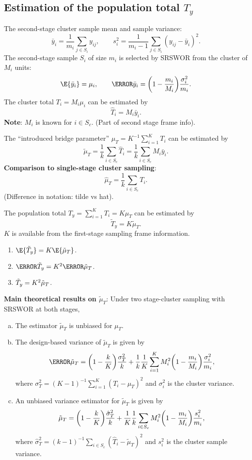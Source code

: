 \subsection{Estimation of the population total \texorpdfstring{$ T_y $}{Ty}}

The second-stage cluster sample mean and sample variance:
\[ \bar{y}_i=\frac{1}{m_i}\sum_{j\in S_i}y_{ij},\qquad s_i^2=\frac{1}{m_i-1}\sum_{j\in S_i}(y_{ij}-\bar{y}_i)^2. \]
The second-stage sample $ S_i $ of size $ m_i $ is selected by SRSWOR from the cluster of $ M_i $ units:
\[ \E{\bar{y}_i}=\mu_i,\qquad \V{\bar{y}_i}=\biggl(1-\frac{m_i}{M_i}\biggr)\frac{\sigma_i^2}{m_i}. \]
The cluster total $ T_i=M_i\mu_i $ can be estimated by
\[ \hat{T}_i=M_i\bar{y}_i. \]
\textbf{Note}: $ M_i $ is known for $ i\in S_c $. (Part of second stage frame info).

The ``introduced bridge parameter'' $ \mu_T=K^{-1}\sum_{i=1}^{K}T_i $ can be estimated by
\[ \tilde{\mu}_T=\frac{1}{k}\sum_{i\in S_c}\hat{T}_i=\frac{1}{k}\sum_{i\in S_c}M_i\bar{y}_i. \]
\textbf{Comparison to single-stage cluster sampling}:
\[ \hat{\mu}_T=\frac{1}{k}\sum_{i\in S_c}T_i. \]
(Difference in notation: tilde vs hat).

The population total $ T_y=\sum_{i=1}^{K}T_i=K\mu_T $ can be estimated by
\[ \tilde{T}_y=K\tilde{\mu}_T. \]
$ K $ is available from the first-stage sampling frame information.
\begin{enumerate}
      \item $ \E{\tilde{T}_y}=K\E{\tilde{\mu}_T} $.
      \item $ \V{\tilde{T}_y}=K^2\V{\tilde{\mu}_T} $.
      \item $ \relax{\tilde{T}_y}=K^2\relax{\tilde{\mu}_T} $.
\end{enumerate}

\textbf{Main theoretical results on $ \tilde{\mu}_T $}: Under two stage-cluster sampling
with SRSWOR at both stages,
\begin{enumerate}[(a)]
      \item The estimator $ \tilde{\mu}_T $ is unbiased for $ \mu_T $.
      \item The design-based variance of $ \tilde{\mu}_T $ is given by
            \[ \V{\tilde{\mu}_T}=\biggl(1-\frac{k}{K}\biggr)\frac{\sigma_T^2}{k}+\frac{1}{k}\frac{1}{K}\sum_{i=1}^{K}M_i^2\biggl(1-\frac{m_i}{M_i}\biggr)\frac{\sigma_i^2}{m_i}, \]
            where $ \sigma_T^2=(K-1)^{-1}\sum_{i=1}^{K}(T_i-\mu_T)^2 $ and $ \sigma_i^2 $ is the cluster variance.
      \item An unbiased variance estimator for $ \tilde{\mu}_T $ is given by
            \[ \relax{\tilde{\mu}_T}=\biggl(1-\frac{k}{K}\biggr)\frac{\hat{\sigma}_T^2}{k}+\frac{1}{K}\frac{1}{k}\sum_{i\in S_c}M_i^2\biggl(1-\frac{m_i}{M_i}\biggr)\frac{s_i^2}{m_i}, \]
            where $ \hat{\sigma}_T^2=(k-1)^{-1}\sum_{i\in S_c}(\hat{T}_i-\tilde{\mu}_T)^2 $ and $ s_i^2 $ is the cluster sample variance.
\end{enumerate}

